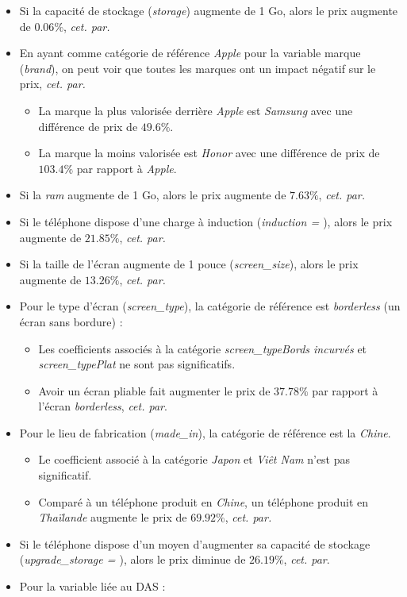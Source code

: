 \documentclass[
  12pt,
]{report}
\providecommand{\tightlist}{%
  \setlength{\itemsep}{0pt}\setlength{\parskip}{0pt}}\usepackage{longtable,booktabs,array}
\renewcommand{\texttt}[1]{\colorbox{light}{\color{highlight}{\ttfamily{#1}}}}
\begin{document}
\begin{itemize}
\item
  Si la capacité de stockage (\emph{storage}) augmente de 1 Go, alors le
  prix augmente de \(0.06\%\), \emph{cet. par.}
\item
  En ayant comme catégorie de référence \emph{Apple} pour la variable
  marque (\emph{brand}), on peut voir que toutes les marques ont un
  impact négatif sur le prix, \emph{cet. par.}

  \begin{itemize}
  \tightlist
  \item
    La marque la plus valorisée derrière \emph{Apple} est \emph{Samsung}
    avec une différence de prix de \(49.6\%\).
  \item
    La marque la moins valorisée est \emph{Honor} avec une différence de
    prix de \(103.4\%\) par rapport à \emph{Apple}.
  \end{itemize}
\item
  Si la \emph{ram} augmente de 1 Go, alors le prix augmente de
  \(7.63\%\), \emph{cet. par.}
\item
  Si le téléphone dispose d'une charge à induction (\emph{induction =
  \texttt{TRUE}}), alors le prix augmente de \(21.85\%\), \emph{cet.
  par.}
\item
  Si la taille de l'écran augmente de 1 pouce (\emph{screen\_size}),
  alors le prix augmente de \(13.26\%\), \emph{cet. par.}
\item
  Pour le type d'écran (\emph{screen\_type}), la catégorie de référence
  est \emph{borderless} (un écran sans bordure) :

  \begin{itemize}
  \tightlist
  \item
    Les coefficients associés à la catégorie \emph{screen\_typeBords
    incurvés} et \emph{screen\_typePlat} ne sont pas significatifs.
  \item
    Avoir un écran pliable fait augmenter le prix de \(37.78\%\) par
    rapport à l'écran \emph{borderless}, \emph{cet. par}.
  \end{itemize}
\item
  Pour le lieu de fabrication (\emph{made\_in}), la catégorie de
  référence est la \emph{Chine}.

  \begin{itemize}
  \tightlist
  \item
    Le coefficient associé à la catégorie \emph{Japon} et \emph{Viêt
    Nam} n'est pas significatif.
  \item
    Comparé à un téléphone produit en \emph{Chine}, un téléphone produit
    en \emph{Thaïlande} augmente le prix de \(69.92\%\), \emph{cet.
    par.}
  \end{itemize}
\item
  Si le téléphone dispose d'un moyen d'augmenter sa capacité de stockage
  (\emph{upgrade\_storage = \texttt{TRUE}}), alors le prix diminue de
  \(26.19\%\), \emph{cet. par}.
\item
  Pour la variable liée au DAS :


\end{itemize}
\end{document}
